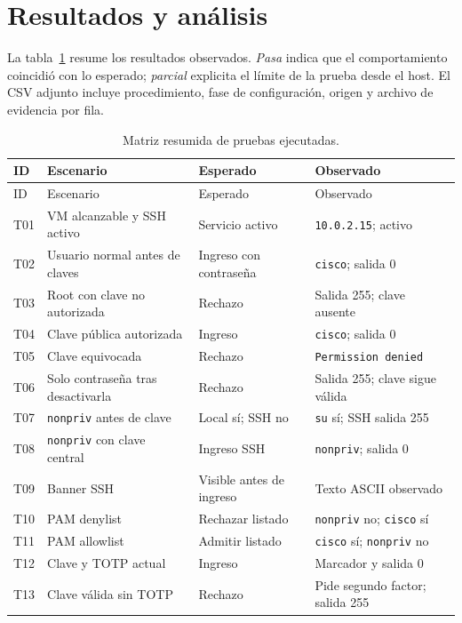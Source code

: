 \documentclass[11pt,a4paper]{article}
\begin{document}
\section{Resultados y análisis}
La tabla~\ref{tab:matriz} resume los resultados observados. \emph{Pasa}
indica que el comportamiento coincidió con lo esperado; \emph{parcial}
explicita el límite de la prueba desde el host. El CSV adjunto incluye
procedimiento, fase de configuración, origen y archivo de evidencia por fila.

\footnotesize
\setlength{\tabcolsep}{3pt}
\begin{longtable}{>{\raggedright\arraybackslash}p{}>{\raggedright\arraybackslash}p{}>{\raggedright\arraybackslash}p{}>{\raggedright\arraybackslash}p{}}
\caption{Matriz resumida de pruebas ejecutadas.}\label{tab:matriz}\\
\hline
ID & Escenario & Esperado & Observado \\
\hline
\endfirsthead
\hline
ID & Escenario & Esperado & Observado \\
\hline
\endhead
T01 & VM alcanzable y SSH activo & Servicio activo & \texttt{10.0.2.15}; activo \\
T02 & Usuario normal antes de claves & Ingreso con contraseña & \texttt{cisco}; salida 0 \\
T03 & Root con clave no autorizada & Rechazo & Salida 255; clave ausente \\
T04 & Clave pública autorizada & Ingreso & \texttt{cisco}; salida 0 \\
T05 & Clave equivocada & Rechazo & \texttt{Permission denied} \\
T06 & Solo contraseña tras desactivarla & Rechazo & Salida 255; clave sigue válida \\
T07 & \texttt{nonpriv} antes de clave & Local sí; SSH no & \texttt{su} sí; SSH salida 255 \\
T08 & \texttt{nonpriv} con clave central & Ingreso SSH & \texttt{nonpriv}; salida 0 \\
T09 & Banner SSH & Visible antes de ingreso & Texto ASCII observado \\
T10 & PAM denylist & Rechazar listado & \texttt{nonpriv} no; \texttt{cisco} sí \\
T11 & PAM allowlist & Admitir listado & \texttt{cisco} sí; \texttt{nonpriv} no \\
T12 & Clave y TOTP actual & Ingreso & Marcador y salida 0 \\
T13 & Clave válida sin TOTP & Rechazo & Pide segundo factor; salida 255 \\

\end{longtable}
\end{document}

